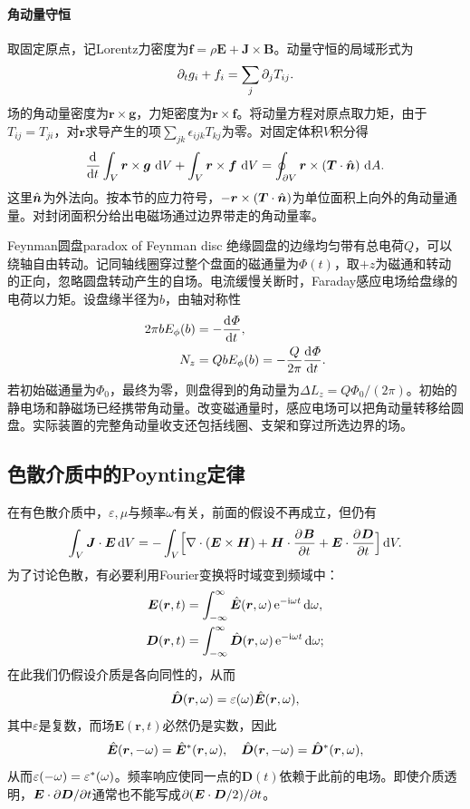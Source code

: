 \paragraph{角动量守恒}
取固定原点，记Lorentz力密度为$\bm f = \rho\bm E + \bm J \times \bm B$。动量守恒的局域形式为
\begin{equation}
    \label{eq:ed-local-momentum-balance}
    \partial_t g_i + f_i = \sum_j\partial_j T_{ij}.
\end{equation}
场的角动量密度为$\bm r \times \bm g$，力矩密度为$\bm r \times \bm f$。将动量方程对原点取力矩，由于$T_{ij} = T_{ji}$，对$\bm r$求导产生的项$\textstyle \sum_{jk}\epsilon_{ijk}T_{kj}$为零。对固定体积$V$积分得
\begin{equation}
    \frac{\mathop{}\!\mathrm{d}^{}}{\mathrm{d}{t}^{}}\int_V\bm r \times \bm g\,\mathop{}\!\mathrm{d} V
    + \int_V\bm r \times \bm f\,\mathop{}\!\mathrm{d} V
    = \oint_{\partial V}\bm r \times (\bm T \cdot \mathop{}\!\hat{\bm{n}})\,\mathop{}\!\mathrm{d} A .
\end{equation}
这里$\mathop{}\!\hat{\bm{n}}$为外法向。按本节的应力符号，$-\bm r \times (\bm T \cdot \mathop{}\!\hat{\bm{n}})$为单位面积上向外的角动量通量。对封闭面积分给出电磁场通过边界带走的角动量率。

\begin{example}{Feynman圆盘}{paradox of Feynman disc}
    绝缘圆盘的边缘均匀带有总电荷$Q$，可以绕轴自由转动。记同轴线圈穿过整个盘面的磁通量为$\varPhi(t)$，取$+z$为磁通和转动的正向，忽略圆盘转动产生的自场。电流缓慢关断时，Faraday感应电场给盘缘的电荷以力矩。设盘缘半径为$b$，由轴对称性
    \begin{align*}
        2\pi b E_\phi(b) &= -\frac{\mathop{}\!\mathrm{d}^{}\varPhi}{\mathrm{d}{t}^{}},\\
        N_z &= QbE_\phi(b) = -\frac{Q}{2\pi}\frac{\mathop{}\!\mathrm{d}^{}\varPhi}{\mathrm{d}{t}^{}} .
    \end{align*}
    若初始磁通量为$\varPhi_0$，最终为零，则盘得到的角动量为$\Delta L_z = Q\varPhi_0/(2\pi)$。初始的静电场和静磁场已经携带角动量。改变磁通量时，感应电场可以把角动量转移给圆盘。实际装置的完整角动量收支还包括线圈、支架和穿过所选边界的场。
\end{example}
\subsection{色散介质中的Poynting定律}
\label{ssec:Poynting in dissipative media}
在有色散介质中，$\varepsilon,\mu$与频率$\omega$有关，前面的假设不再成立，但仍有
\[
    \int_V\bm J \cdot \bm E\mathop{}\!\mathrm{d} V = -\int_V\Bigl[\nabla\cdot(\bm E \times \bm H) + \bm H \cdot \frac{\partial^{}\bm B}{\partial{t}^{}} + \bm E \cdot \frac{\partial^{}\bm D}{\partial{t}^{}}\Bigr]\mathop{}\!\mathrm{d} V.
\]
为了讨论色散，有必要利用Fourier变换将时域变到频域中：
\begin{align*}
    \bm E(\bm r,t) &= \int_{-\infty}^\infty\hat{\bm{E}}(\bm r,\omega)\mathop{}\!\mathrm{e}^{-\mathrm{i}\omega t}\mathop{}\!\mathrm{d}\omega,\\
    \bm D(\bm r,t) &= \int_{-\infty}^\infty\hat{\bm{D}}(\bm r,\omega)\mathop{}\!\mathrm{e}^{-\mathrm{i}\omega t}\mathop{}\!\mathrm{d}\omega;
\end{align*}
在此我们仍假设介质是各向同性的，从而
\[
    \hat{\bm{D}}(\bm r,\omega) = \varepsilon(\omega)\hat{\bm{E}}(\bm r,\omega),
\]
其中$\varepsilon$是复数，而场$\bm E(\bm r,t)$必然仍是实数，因此%
\[
    \hat{\bm{E}}(\bm r,-\omega) = \hat{\bm{E}}^\ast(\bm r,\omega),\quad\hat{\bm{D}}(\bm r,-\omega) = \hat{\bm{D}}^\ast(\bm r,\omega),
\]
从而$\varepsilon(-\omega) = \varepsilon^\ast(\omega)$。频率响应使同一点的$\bm D(t)$依赖于此前的电场。即使介质透明，$\bm E \cdot \partial\bm D/\partial t$通常也不能写成$\partial(\bm E \cdot \bm D/2)/\partial t$。

